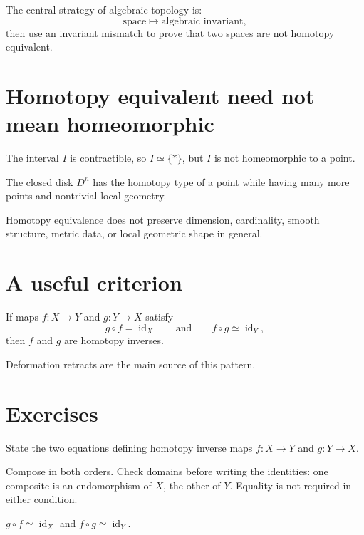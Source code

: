 The central strategy of algebraic topology is:
\[
\text{space}
\longmapsto
\text{algebraic invariant},
\]
then use an invariant mismatch to prove that two spaces are not homotopy
equivalent.

\section{Homotopy equivalent need not mean homeomorphic}

\begin{example}
\label{ex:viii02-interval-point}
The interval \(I\) is contractible, so \(I\simeq\{*\}\), but \(I\) is not
homeomorphic to a point.
\end{example}

\begin{example}
The closed disk \(D^n\) has the homotopy type of a point while having many more
points and nontrivial local geometry.
\end{example}

\begin{warning}
\label{warn:viii02-properties}
Homotopy equivalence does not preserve dimension, cardinality, smooth
structure, metric data, or local geometric shape in general.
\end{warning}

\section{A useful criterion}

\begin{proposition}
\label{prop:viii02-criterion}
If maps \(f:X\to Y\) and \(g:Y\to X\) satisfy
\[
g\circ f=\operatorname{id}_X
\qquad\text{and}\qquad
f\circ g\simeq\operatorname{id}_Y,
\]
then \(f\) and \(g\) are homotopy inverses.
\end{proposition}

Deformation retracts are the main source of this pattern.

\section{Exercises}

\begin{exercise}\label{exr:viii02-01}
State the two equations defining homotopy inverse maps \(f:X\to Y\) and \(g:Y\to X\).
\end{exercise}
\begin{hint}Compose in both orders.
Check domains before writing the identities: one composite is an endomorphism of \(X\), the other of \(Y\). Equality is not required in either condition.
\end{hint}
\begin{solution}
\(g\circ f\simeq\operatorname{id}_X\) and
\(f\circ g\simeq\operatorname{id}_Y\).
\end{solution}


